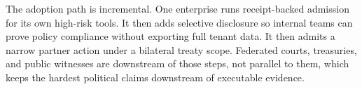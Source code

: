 The adoption path is incremental. One enterprise runs receipt-backed admission for its own high-risk tools. It then adds selective disclosure so internal teams can prove policy compliance without exporting full tenant data. It then admits a narrow partner action under a bilateral treaty scope. Federated courts, treasuries, and public witnesses are downstream of those steps, not parallel to them, which keeps the hardest political claims downstream of executable evidence.

